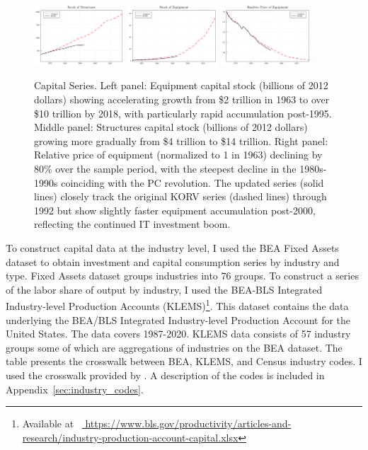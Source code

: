 \documentclass[12pt]{article}
\begin{document}
\begin{figure}%
\centering
\includegraphics[width=0.3\textwidth]{../images/capital_equipment_doc.pdf}
\hfill
\includegraphics[width=0.3\textwidth]{../images/capital_structures_doc.pdf}
\hfill
\includegraphics[width=0.3\textwidth]{../images/capital_price_doc.pdf}
\caption{\label{fig:capital_series} Capital Series. Left panel: Equipment capital stock (billions of 2012 dollars) showing accelerating growth from \$2 trillion in 1963 to over \$10 trillion by 2018, with particularly rapid accumulation post-1995. Middle panel: Structures capital stock (billions of 2012 dollars) growing more gradually from \$4 trillion to \$14 trillion. Right panel: Relative price of equipment (normalized to 1 in 1963) declining by 80\% over the sample period, with the steepest decline in the 1980s-1990s coinciding with the PC revolution. The updated series (solid lines) closely track the original KORV series (dashed lines) through 1992 but show slightly faster equipment accumulation post-2000, reflecting the continued IT investment boom.}
\end{figure}

To construct capital data at the industry level, I used the BEA Fixed Assets dataset to obtain investment and capital consumption series by industry and type. Fixed Assets dataset groups industries into 76 groups. To construct a series of the labor share of output by industry, I used the BEA-BLS Integrated Industry-level Production Accounts (KLEMS)\footnote{Available at \ \url{ https://www.bls.gov/productivity/articles-and-research/industry-production-account-capital.xlsx}}. This dataset contains the data underlying the BEA/BLS Integrated Industry-level Production Account for the United States. The data covers 1987-2020. KLEMS data consists of 57 industry groups some of which are aggregations of industries on the BEA dataset. The table presents the crosswalk between BEA, KLEMS, and Census industry codes. I used the crosswalk provided by \citep{acemoglu2020unpacking}. A description of the codes is included in Appendix~\ref{sec:industry_codes}.
\end{document}
